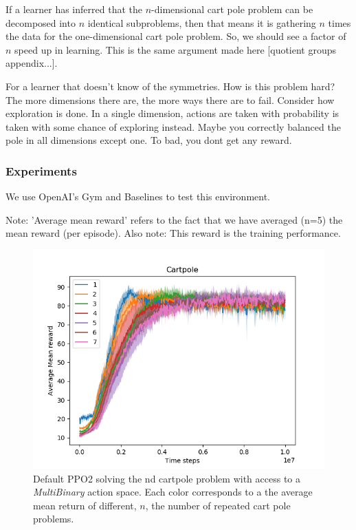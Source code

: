 If a learner has inferred that the $n$-dimensional cart pole problem can be decomposed into $n$ identical subproblems,
then that means it is gathering $n$ times the data for the one-dimensional cart pole problem.
So, we should see a factor of $n$ speed up in learning.
This is the same argument made here [quotient groups appendix...].

For a learner that doesn't know of the symmetries. How is this problem hard?
The more dimensions there are, the more ways there are to fail.
Consider how exploration is done. In a single dimension, actions are taken with probability  is
taken with some chance of exploring instead.
Maybe you correctly balanced the pole in all dimensions except one. To bad, you dont get any reward.

\subsubsection{Experiments}

We use OpenAI's Gym \cite{Brockman2016} and Baselines \cite{baselines} to test this environment.


Note: 'Average mean reward' refers to the fact that we have averaged (n=5)
the mean reward (per episode). Also note: This reward is the training performance.

\begin{figure}[h!]
  \centering
  \includegraphics[width=1\textwidth,height=0.5\textheight]{../../pictures/figures/multibinary-nd-cart.png}
  \caption{Default PPO2 solving the nd cartpole problem with access to a \textit{MultiBinary} action space. Each color corresponds to a the average mean return of different, $n$, the number of repeated cart pole problems.}
\end{figure}


